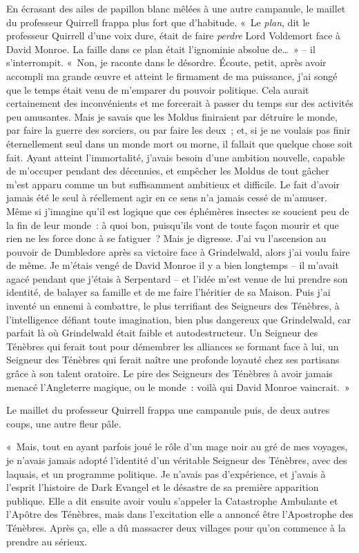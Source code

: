 En écrasant des ailes de papillon blanc mêlées à une autre campanule, le maillet du professeur Quirrell frappa plus fort que d'habitude. «~Le \emph{plan}, dit le professeur Quirrell d'une voix dure, était de faire \emph{perdre} Lord Voldemort face à David Monroe. La faille dans ce plan était l'ignominie absolue de…~» -- il s'interrompit. «~Non, je raconte dans le désordre. Écoute, petit, après avoir accompli ma grande œuvre et atteint le firmament de ma puissance, j'ai songé que le temps était venu de m'emparer du pouvoir politique. Cela aurait certainement des inconvénients et me forcerait à passer du temps sur des activités peu amusantes. Mais je savais que les Moldus finiraient par détruire le monde, par faire la guerre des sorciers, ou par faire les deux~; et, si je ne voulais pas finir éternellement seul dans un monde mort ou morne, il fallait que quelque chose soit fait. Ayant atteint l'immortalité, j'avais besoin d'une ambition nouvelle, capable de m'occuper pendant des décennies, et empêcher les Moldus de tout gâcher m'est apparu comme un but suffisamment ambitieux et difficile. Le fait d'avoir jamais été le seul à réellement agir en ce sens n'a jamais cessé de m'amuser. Même si j'imagine qu'il est logique que ces éphémères insectes se soucient peu de la fin de leur monde~: à quoi bon, puisqu'ils vont de toute façon mourir et que rien ne les force donc à se fatiguer~? Mais je digresse. J'ai vu l'ascension au pouvoir de Dumbledore après sa victoire face à Grindelwald, alors j'ai voulu faire de même. Je m'étais vengé de David Monroe il y a bien longtemps -- il m'avait agacé pendant que j'étais à Serpentard -- et l'idée m'est venue de lui prendre son identité, de balayer sa famille et de me faire l'héritier de sa Maison. Puis j'ai inventé un ennemi à combattre, le plus terrifiant des Seigneurs des Ténèbres, à l'intelligence défiant toute imagination, bien plus dangereux que Grindelwald, car parfait là où Grindelwald était faible et autodestructeur. Un Seigneur des Ténèbres qui ferait tout pour démembrer les alliances se formant face à lui, un Seigneur des Ténèbres qui ferait naître une profonde loyauté chez ses partisans grâce à son talent oratoire. Le pire des Seigneurs des Ténèbres à avoir jamais menacé l'Angleterre magique, ou le monde~: voilà qui David Monroe vaincrait.~»

Le maillet du professeur Quirrell frappa une campanule puis, de deux autres coups, une autre fleur pâle.

«~Mais, tout en ayant parfois joué le rôle d'un mage noir au gré de mes voyages, je n'avais jamais adopté l'identité d'un véritable Seigneur des Ténèbres, avec des laquais, et un programme politique. Je n'avais pas d'expérience, et j'avais à l'esprit l'histoire de Dark Evangel et le désastre de sa première apparition publique. Elle a dit ensuite avoir voulu s'appeler la Catastrophe Ambulante et l'Apôtre des Ténèbres, mais dans l'excitation elle a annoncé être l'Apostrophe des Ténèbres. Après ça, elle a dû massacrer deux villages pour qu'on commence à la prendre au sérieux.

